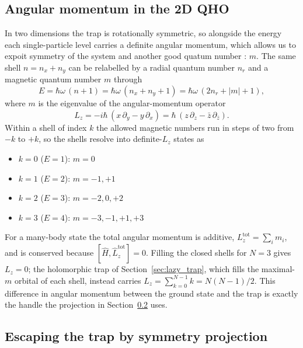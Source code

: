 \documentclass[a4paper,11pt,twoside]{article}
\begin{document}
\newpage

\subsection{Angular momentum in the 2D QHO}
\label{sec:angular_momentum}

In two dimensions the trap is rotationally symmetric, so alongside the energy each single-particle level carries a definite angular momentum, which allows us to expoit symmetry of the system and another good quatum number : $m$. The same shell $n = n_x + n_y$ can be relabelled by a radial quantum number $n_r$ and a magnetic quantum number $m$ through
\begin{equation}
    E = \hbar\omega\,(n + 1) = \hbar\omega\,(n_x + n_y + 1) = \hbar\omega\,(2 n_r + |m| + 1),
\end{equation}
where $m$ is the eigenvalue of the angular-momentum operator
\begin{equation}
    \hat L_z = -i\hbar\,(x\,\partial_y - y\,\partial_x) = \hbar\,(z\,\partial_z - \bar z\,\partial_{\bar z}).
    \label{eq:lz_operator}
\end{equation}
Within a shell of index $k$ the allowed magnetic numbers run in steps of two from $-k$ to $+k$, so the shells resolve into definite-$L_z$ states as

\begin{itemize}
    \item $k=0$ ($E=1$): $m = 0$
    \item $k=1$ ($E=2$): $m = -1, +1$
    \item $k=2$ ($E=3$): $m = -2, 0, +2$
    \item $k=3$ ($E=4$): $m = -3, -1, +1, +3$
\end{itemize}

For a many-body state the total angular momentum is additive, $L_z^{\text{tot}} = \sum_i m_i$, and is conserved because $[\hat H, \hat L_z^{\text{tot}}] = 0$. Filling the closed shells for $N=3$ gives $L_z = 0$; the holomorphic trap of Section~\ref{sec:lazy_trap}, which fills the maximal-$m$ orbital of each shell, instead carries $L_z = \sum_{k=0}^{N-1} k = N(N-1)/2$. This difference in angular momentum between the ground state and the trap is exactly the handle the projection in Section~\ref{sec:lz_projection} uses.

\subsection{Escaping the trap by symmetry projection}
\label{sec:lz_projection}
\end{document}
